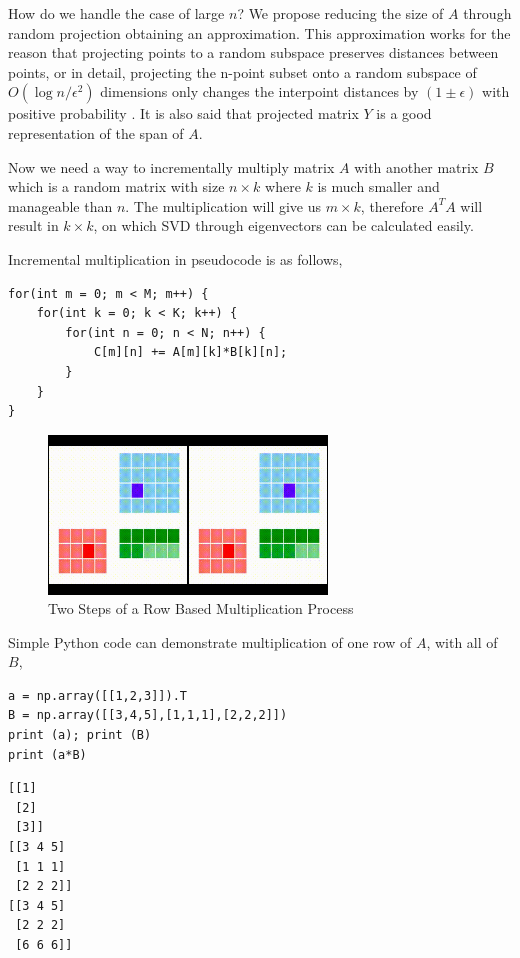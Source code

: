 \documentclass{article}
\begin{document}
How do we handle the case of large $n$? We propose reducing the size of $A$
through random projection obtaining an approximation. This approximation works
for the reason that projecting points to a random subspace preserves distances
between points, or in detail, projecting the n-point subset onto a random
subspace of $O(\log n/\epsilon^2)$ dimensions only changes the interpoint
distances by $(1 \pm \epsilon)$ with positive probability \cite{gupta}. It is
also said that projected matrix $Y$ is a good representation of the span of $A$.

Now we need a way to incrementally multiply matrix $A$ with another matrix $B$
which is a random matrix with size $n \times k$ where $k$ is much smaller and
manageable than $n$. The multiplication will give us $m \times k$, therefore
$A^TA$ will result in $k \times k$, on which SVD through eigenvectors can be
calculated easily.

Incremental multiplication in pseudocode is as follows,

\begin{verbatim}
for(int m = 0; m < M; m++) {
    for(int k = 0; k < K; k++) {
        for(int n = 0; n < N; n++) {
            C[m][n] += A[m][k]*B[k][n];
        }
    }
}
\end{verbatim}

\begin{figure}[h]
  \centering
  \includegraphics[width=20em]{mult1.jpg}
  \caption{Two Steps of a Row Based Multiplication Process}
  \label{fig:mult1}
\end{figure}

Simple Python code can demonstrate multiplication of one row of $A$,
with all of $B$,

\begin{verbatim}
a = np.array([[1,2,3]]).T
B = np.array([[3,4,5],[1,1,1],[2,2,2]])
print (a); print (B)
print (a*B)
\end{verbatim}

\begin{verbatim}
[[1]
 [2]
 [3]]
[[3 4 5]
 [1 1 1]
 [2 2 2]]
[[3 4 5]
 [2 2 2]
 [6 6 6]]
\end{verbatim}
\end{document}
